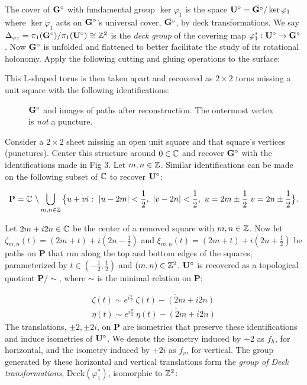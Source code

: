 \documentclass[]{article}
\begin{document}
The cover of $\mathbf{G}^\circ$ with fundamental group $\ker\varphi_1$ is the space $\mathbf{U}^\circ=\tilde{\mathbf{G}^\circ}/\ker\varphi_1$ where $\ker\varphi_1$ acts on $\mathbf{G}^\circ$'s universal cover, $\tilde{\mathbf{G}^\circ}$, by deck transformations. We say $\Delta_{\varphi_1}=\pi_1(\mathbf{G}^\circ)/\pi_1(\mathbf{U}^\circ)\cong\mathbb{Z}^2$ is the \emph{deck group} of the covering map $\varphi_1^*:\mathbf{U}^\circ\rightarrow\mathbf{G}^\circ$. Now $\mathbf{G}^\circ$ is unfolded and flattened to better facilitate the study of its rotational holonomy. Apply the following cutting and gluing operations to the surface: \\
\begin{figure}[H]
\centering

\end{figure}
\noindent This L-shaped torus is then taken apart and recovered as $2\times 2$ torus missing a unit square with the following identifications:\\
\begin{figure}[H]
\centering

\caption{$\mathbf{G}^\circ$ and images of paths after reconstruction. The outermost vertex is \emph{not} a puncture.}
\end{figure}

Consider a $2\times2$ sheet missing an open unit square and that square's vertices (punctures). Center this structure around $0\in\mathbb{C}$ and recover $\mathbf{G}^\circ$ with the identifications made in Fig 3. Let $m,n\in\mathbb{Z}$. Similar identifications can be made on the following subset of $\mathbb{C}$ to recover $\mathbf{U}^\circ$:

\begin{equation}
\label{eq:P}
\mathbf{P} = \mathbb{C}\text{ }\backslash\bigcup_{m,n \in {\mathbb Z}} \big{\{} u+vi:~|u-2m|<\frac{1}{2},~|v-2n|<\frac{1}{2},~u=2m\pm\frac{1}{2}~v=2n\pm\frac{1}{2} \big{\}}.
\end{equation}


\noindent Let $2m+i2n\in\mathbb{C}$ be the center of a removed square with $m,n\in\mathbb{Z}$. Now let $\zeta_{m,n}(t)=(2m+t)+i(2n-\frac{1}{2})$ and 
$\xi_{m,n}(t)=(2m+t)+i(2n+\frac{1}{2})$ be paths on $\mathbf{P}$ that run along the top and bottom edges of the squares, parameterized by $t\in (-\frac{1}{2},\frac{1}{2})$ and $(m,n)\in\mathbb{Z}^2$. $\mathbf{U}^\circ$ is recovered as a topological quotient $\mathbf{P}/\sim$, where $\sim$ is the minimal relation on $\mathbf{P}$:

\begin{equation}
\begin{split}
\zeta(t)\sim e^{i\frac{\pi}{2}}~\overline{\zeta(t)-(2m+i2n)}\\
\eta(t)\sim e^{i\frac{\pi}{2}}~\overline{\eta(t)-(2m+i2n)}
\label{eq:rel2}
\end{split}
\end{equation}
The translations, $\pm 2,\pm 2i$, on $\mathbf{P}$ are isometries that preserve these identifications and induce isometries of $\mathbf{U}^\circ$. We denote the isometry induced by $+2$ as $f_h$, for horizontal, and the isometry induced by $+2i$ as $f_v$, for vertical. The group generated by these horizontal and vertical translations form the \emph{group of Deck transformations}, $\text{Deck}(\varphi_1^*)$, isomorphic to $\mathbb{Z}^2$:
\end{document}
